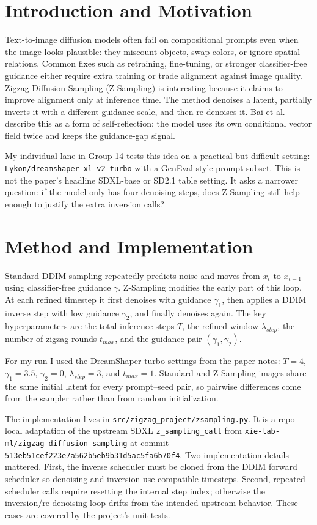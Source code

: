 \section{Introduction and Motivation}

Text-to-image diffusion models often fail on compositional prompts even when the image looks plausible: they miscount objects, swap colors, or ignore spatial relations. Common fixes such as retraining, fine-tuning, or stronger classifier-free guidance either require extra training or trade alignment against image quality. Zigzag Diffusion Sampling (Z-Sampling) is interesting because it claims to improve alignment only at inference time. The method denoises a latent, partially inverts it with a different guidance scale, and then re-denoises it. Bai et al. describe this as a form of self-reflection: the model uses its own conditional vector field twice and keeps the guidance-gap signal.

My individual lane in Group 14 tests this idea on a practical but difficult setting: \texttt{Lykon/dreamshaper-xl-v2-turbo} with a GenEval-style prompt subset. This is not the paper's headline SDXL-base or SD2.1 table setting. It asks a narrower question: if the model only has four denoising steps, does Z-Sampling still help enough to justify the extra inversion calls?

\section{Method and Implementation}

Standard DDIM sampling repeatedly predicts noise and moves from $x_t$ to $x_{t-1}$ using classifier-free guidance $\gamma$. Z-Sampling modifies the early part of this loop. At each refined timestep it first denoises with guidance $\gamma_1$, then applies a DDIM inverse step with low guidance $\gamma_2$, and finally denoises again. The key hyperparameters are the total inference steps $T$, the refined window $\lambda_{step}$, the number of zigzag rounds $t_{max}$, and the guidance pair $(\gamma_1, \gamma_2)$.

For my run I used the DreamShaper-turbo settings from the paper notes: $T=4$, $\gamma_1=3.5$, $\gamma_2=0$, $\lambda_{step}=3$, and $t_{max}=1$. Standard and Z-Sampling images share the same initial latent for every prompt--seed pair, so pairwise differences come from the sampler rather than from random initialization.

The implementation lives in \texttt{src/zigzag\_project/zsampling.py}. It is a repo-local adaptation of the upstream SDXL \texttt{z\_sampling\_call} from \texttt{xie-lab-ml/zigzag-diffusion-sampling} at commit \texttt{513eb51cef223e7a562b5eb9b31d5ac5fa6b70f4}. Two implementation details mattered. First, the inverse scheduler must be cloned from the DDIM forward scheduler so denoising and inversion use compatible timesteps. Second, repeated scheduler calls require resetting the internal step index; otherwise the inversion/re-denoising loop drifts from the intended upstream behavior. These cases are covered by the project's unit tests.

